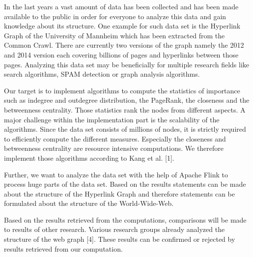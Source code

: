 In the last years a vast amount of data has been collected and has been made available to the public in order for everyone to analyze this data and gain knowledge about its structure. One example for such data set is the Hyperlink Graph of the University of Mannheim which has been extracted from the Common Crawl. There are currently two versions of the graph namely the 2012 and 2014 version each covering billions of pages and hyperlinks between those pages. Analyzing this data set may be beneficially for multiple research fields like  search algorithms, SPAM detection or graph analysis algorithms.  
 
Our target is to implement algorithms to compute the statistics of importance such as indegree and outdegree distribution, the PageRank, the closeness and the betweenness centrality. Those statistics rank the nodes from different aspects. A major challenge within the implementation part is the scalability of the algorithms. Since the data set consists of millions of nodes, it is strictly required to efficiently compute the different measures. Especially the closeness and betweenness centrality are resource intensive computations. We therefore implement those algorithms according to Kang et al. [1].

Further, we want to analyze the data set with the help of Apache Flink to process huge parts of the data set. Based on the results statements can be made about the structure of the Hyperlink Graph and therefore  statements can be formulated about the structure of the World-Wide-Web.

Based on the results retrieved from the computations, comparisons will be made to results of other research. Various research groups already analyzed the structure of the web graph [4]. These results can be confirmed or rejected by results retrieved from our computation.